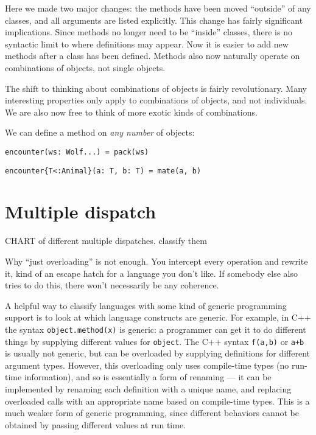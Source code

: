 Here we made two major changes: the methods have been moved ``outside''
of any classes, and all arguments are listed explicitly. This change
has fairly significant implications. Since methods no longer need to be
``inside'' classes, there is no syntactic limit to where definitions
may appear. Now it is easier to add new methods after a class has
been defined. Methods also now naturally operate on combinations of
objects, not single objects.

The shift to thinking about combinations of objects is fairly
revolutionary. Many interesting properties only apply to combinations
of objects, and not individuals. We are also now free to think of
more exotic kinds of combinations.

We can define a method on \emph{any number} of objects:

\begin{verbatim}
encounter(ws: Wolf...) = pack(ws)
\end{verbatim}



\begin{verbatim}
encounter{T<:Animal}(a: T, b: T) = mate(a, b)
\end{verbatim}


\section{Multiple dispatch}

CHART of different multiple dispatches. classify them

Why ``just overloading'' is not enough. You intercept every operation and
rewrite it, kind of an escape hatch for a language you don't like. If
somebody else also tries to do this, there won't necessarily be any
coherence.

A helpful way to classify languages with some kind of generic programming
support is to look at which language constructs are generic. For example,
in C++ the syntax \texttt{object.method(x)} is generic: a programmer can
get it to do different things by supplying different values for
\texttt{object}. The C++ syntax \texttt{f(a,b)} or \texttt{a+b} is
usually not generic, but can be overloaded by supplying definitions for
different argument types. However, this overloading only uses compile-time
types (no run-time information), and so is essentially a form of renaming ---
it can be implemented by renaming each definition with a unique name, and
replacing overloaded calls with an appropriate name based on compile-time
types. This is a much weaker form of generic programming, since different
behaviors cannot be obtained by passing different values at run time.

